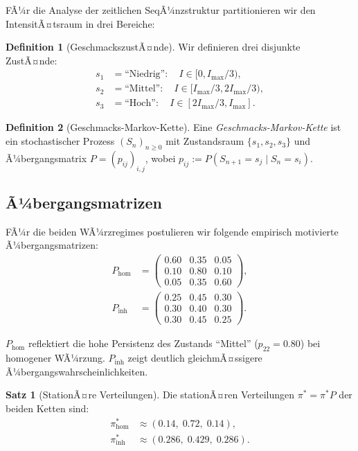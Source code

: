 ﻿\documentclass[12pt,a4paper]{article}
\theoremstyle{definition}
\newtheorem{definition}{Definition}[section]
\newtheorem{theorem}{Satz}[section]
\begin{document}
FÃ¼r die Analyse der zeitlichen SeqÃ¼nzstruktur partitionieren wir den
IntensitÃ¤tsraum in drei Bereiche:

\begin{definition}[GeschmackszustÃ¤nde]
Wir definieren drei disjunkte ZustÃ¤nde:
\begin{align*}
  s_1 &= \text{``Niedrig''}: \quad I \in [0, I_{\max}/3), \\
  s_2 &= \text{``Mittel''}: \quad I \in [I_{\max}/3, 2I_{\max}/3), \\
  s_3 &= \text{``Hoch''}: \quad I \in [2I_{\max}/3, I_{\max}].
\end{align*}
\end{definition}

\begin{definition}[Geschmacks-Markov-Kette]
Eine \emph{Geschmacks-Markov-Kette} ist ein stochastischer Prozess
$(S_n)_{n \geq 0}$ mit Zustandsraum $\{s_1, s_2, s_3\}$ und
Ã¼bergangsmatrix $P = (p_{ij})_{i,j}$, wobei
$p_{ij} := P(S_{n+1} = s_j \mid S_n = s_i)$.
\end{definition}

\subsection{Ã¼bergangsmatrizen}

FÃ¼r die beiden WÃ¼rzregimes postulieren wir folgende empirisch
motivierte Ã¼bergangsmatrizen:
\begin{align}
  P_{\mathrm{hom}} &= \begin{pmatrix}
    0.60 & 0.35 & 0.05 \\
    0.10 & 0.80 & 0.10 \\
    0.05 & 0.35 & 0.60
  \end{pmatrix}, \label{eq:phom} \\
  P_{\mathrm{inh}} &= \begin{pmatrix}
    0.25 & 0.45 & 0.30 \\
    0.30 & 0.40 & 0.30 \\
    0.30 & 0.45 & 0.25
  \end{pmatrix}. \label{eq:pinh}
\end{align}

$P_{\mathrm{hom}}$ reflektiert die hohe Persistenz des Zustands ``Mittel''
($p_{22} = 0.80$) bei homogener WÃ¼rzung. $P_{\mathrm{inh}}$ zeigt deutlich
gleichmÃ¤ssigere Ã¼bergangswahrs\-cheinlichkeiten.

\begin{theorem}[StationÃ¤re Verteilungen]
Die stationÃ¤ren Verteilungen $\pi^* = \pi^* P$ der beiden Ketten sind:
\begin{align*}
  \pi_{\mathrm{hom}}^* &\approx (0.14,\; 0.72,\; 0.14), \\
  \pi_{\mathrm{inh}}^* &\approx (0.286,\; 0.429,\; 0.286).
\end{align*}
\end{theorem}
\end{document}
